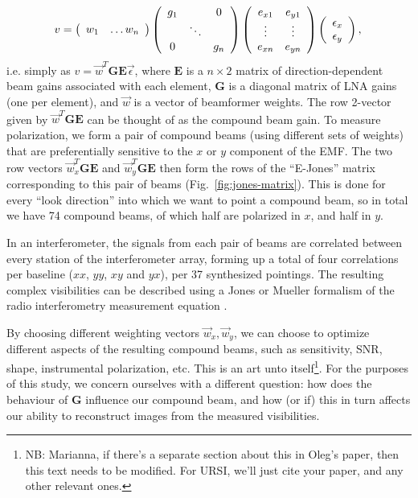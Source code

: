 \documentclass[10pt]{article}
\begin{document}
\begin{equation}
v =
\left( 
  \begin{array}{ccc}
  w_{1} & \ldots w_n 
  \end{array} 
\right)
\left( 
  \begin{array}{ccc}
  g_{1} & & 0\\
  & \ddots & \\
  0 & & g_n  
  \end{array} 
\right) 
\left( 
  \begin{array}{cc}
  e_{x1} & e_{y1} \\
  \vdots & \vdots \\
  e_{xn} & e_{yn} 
  \end{array} 
\right) 
\left(
  \begin{array}{c}
  \epsilon_x \\
  \epsilon_y
  \end{array} 
\right), \\
\end{equation}
i.e. simply as $v=\vec w^T \mathbf{G} \mathbf{E} \vec\epsilon$, where $\mathbf{E}$ is a $n\times2$ matrix of direction-dependent beam gains associated with each element, $\mathbf{G}$ is a diagonal matrix of LNA gains (one per element), and $\vec w$ is a vector of beamformer weights. The row 2-vector given by $\vec w^T \mathbf{G} \mathbf{E}$ can be thought of as the compound beam gain. To measure polarization, we form a pair of compound beams (using different sets of weights) that are preferentially sensitive to the $x$ or $y$ component of the EMF. The two row vectors $\vec w_x^T \mathbf{G} \mathbf{E}$ and $\vec w_y^T \mathbf{G} \mathbf{E}$ then form the rows of the ``E-Jones'' matrix corresponding to this pair of beams (Fig.~\ref{fig:jones-matrix}). This is done for every ``look direction'' into which we want to point a compound beam, so in total we have 74 compound beams, of which half are polarized in $x$, and half in $y$.

In an interferometer, the signals from each pair of beams are correlated between every station of the interferometer array, forming up a total of four correlations per baseline ($xx$, $yy$, $xy$ and $yx$), per 37 synthesized pointings. The resulting complex visibilities can be described using a Jones or Mueller formalism of the radio interferometry measurement equation \citep[or RIME, see][]{ME1,ME4}. 

By choosing different weighting vectors $\vec w_x,\vec w_y$, we can choose to optimize different aspects of the resulting compound beams, such as sensitivity, SNR, shape, instrumental polarization, etc. This is an art unto itself\footnote{NB: Marianna, if there's a separate section about this in Oleg's paper, then this text needs to be modified. For URSI, we'll just cite your paper, and any other relevant ones.}. For the purposes of this study, we concern ourselves with a different question: how does the behaviour of $\mathbf{G}$ influence our compound beam, and how (or if) this in turn affects our ability to reconstruct images from the measured visibilities.
\end{document}

